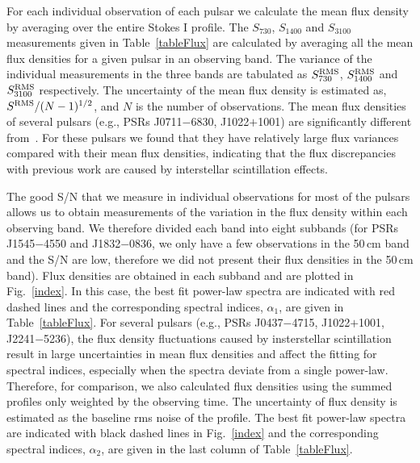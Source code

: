 \documentclass[useAMS,usenatbib]{mn2e}
\begin{document}
For each individual observation of each pulsar we calculate the mean flux 
density by averaging over the entire Stokes I profile. 
%
The $S_{730}$, $S_{1400}$ and $S_{3100}$ measurements given in Table~\ref{tableFlux} 
are calculated by averaging all the mean flux densities for a given pulsar 
in an observing band.  
%
The variance of the individual measurements in the three bands are tabulated 
as $S^{\rm{RMS}}_{730}$, $S^{\rm{RMS}}_{1400}$ and $S^{\rm{RMS}}_{3100}$ respectively. 
%
The uncertainty of the mean flux density is estimated as, $S^{\rm{RMS}}/(N-1)^{1/2}$, 
and $N$ is the number of observations.
%
The mean flux densities of several pulsars (e.g., PSRs J0711$-$6830, J1022$+$1001) 
are significantly different from~\citet{Yan11}. For these pulsars we found that 
they have relatively large flux variances compared with their mean flux densities, 
indicating that the flux discrepancies with previous work are caused by interstellar 
scintillation effects.
%

The good S/N that we measure in individual observations for most of the pulsars allows us 
to obtain measurements of the variation in the flux density within each observing band. 
We therefore divided each band into eight subbands (for PSRs J1545$-$4550 and J1832$-$0836, 
we only have a few observations in the 50\,cm band and the S/N are low, therefore we 
did not present their flux densities in the 50\,cm band).
%
Flux densities are obtained in each subband and are plotted in Fig.~\ref{index}. 
%
In this case, the best fit power-law spectra are indicated with red dashed lines and the corresponding 
spectral indices, $\alpha_1$, are given in Table~\ref{tableFlux}.
%
For several pulsars (e.g., PSRs J0437$-$4715, J1022$+$1001, J2241$-$5236), the flux density 
fluctuations caused by insterstellar scintillation result in large uncertainties in 
mean flux densities and affect the fitting for spectral indices, especially when the 
spectra deviate from a single power-law.
%
Therefore, for comparison, we also calculated flux densities using the summed profiles 
only weighted by the observing time. The uncertainty of flux density is estimated 
as the baseline rms noise of the profile. 
%
The best fit power-law spectra are indicated with black dashed lines in Fig.~\ref{index} 
and the corresponding spectral indices, $\alpha_2$, are given in the last column of Table~\ref{tableFlux}.
%
\end{document}

